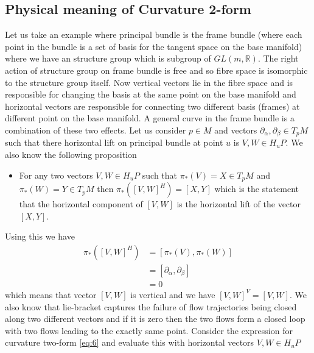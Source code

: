 \documentclass[12pt]{article}
\begin{document}
\subsection{Physical meaning of Curvature 2-form}
Let us take an example where principal bundle is the frame bundle (where each point in the bundle is a set of basis for the tangent space on the base manifold) where we have an structure group which is subgroup of $GL(m, \mathbb{R})$. The right action of structure group on frame bundle is free and so fibre space is isomorphic to the structure group itself. Now vertical vectors lie in the fibre space and is responsible for changing the basis at the same point on the base manifold and horizontal vectors are responsible for connecting two different basis (frames) at different point on the base manifold. A general curve in the frame bundle is a combination of these two effects. Let us consider $p\in M$ and vectors $\partial_{\alpha}, \partial_{\beta}\in T_{p}M$ such that there horizontal lift on principal bundle at point $u$ is $V, W\in H_{u}P$. We also know the following proposition
\begin{itemize}
    \item For any two vectors $V, W\in H_{u}P$ such that $\pi_{\ast}(V) = X\in T_{p}M$ and $\pi_{\ast}(W) = Y\in T_{p}M$ then $\pi_{\ast}([V, W]^{H}) = [X, Y]$ which is the statement that the horizontal component of $[V, W]$ is the horizontal lift of the vector $[X, Y]$.
\end{itemize}
Using this we have
\begin{align*}
    \pi_{\ast}([V, W]^{H}) &= [\pi_{\ast}(V), \pi_{\ast}(W)] \\
                           &= [\partial_{\alpha}, \partial_{\beta}] \\
                           &= 0
\end{align*} which means that vector $[V, W]$ is vertical and we have $[V, W]^{V} = [V, W]$. We also know that lie-bracket captures the failure of flow trajectories being closed along two different vectors and if it is zero then the two flows form a closed loop with two flows leading to the exactly same point. Consider the expression for curvature two-form \ref{eq:6}
and evaluate this with horizontal vectors $V, W\in H_{u}P$
\end{document}
